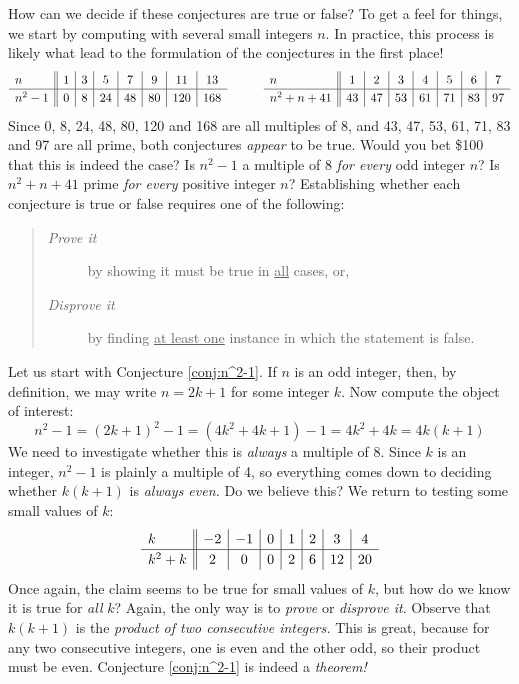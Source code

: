 How can we decide if these conjectures are true or false? To get a feel for things, we start by computing with several small integers $n$. In practice, this process is likely what lead to the formulation of the conjectures in the first place!
\[
	\def\arraystretch{1.2}
	\begin{array}{l||c|c|c|c|c|c|c}
		n & 1 & 3 & 5 & 7 & 9 & 11 & 13\\\hline
		n^2-1 & 0 & 8 & 24 & 48 & 80 & 120 & 168
	\end{array}
	\qquad\quad
	\begin{array}{l||c|c|c|c|c|c|c}
		n & 1 & 2 & 3 & 4 & 5 & 6 & 7\\\hline
		n^2+n+41 & 43 & 47 & 53 & 61 & 71 & 83 & 97
	\end{array}
\]
Since 0, 8, 24, 48, 80, 120 and 168 are all multiples of 8, and 43, 47, 53, 61, 71, 83 and 97 are all prime, both conjectures \emph{appear} to be true. Would you bet \$100 that this is indeed the case? Is $n^2-1$ a multiple of 8 \emph{for every} odd integer $n$? Is $n^2+n+41$ prime \emph{for every} positive integer $n$? Establishing whether each conjecture is true or false requires one of the following:

\begin{quote}
\begin{description}
  \item[\normalfont\emph{Prove it}] by showing it must be true in \underline{all} cases, or,
  \item[\normalfont\emph{Disprove it}] by finding \underline{at least one} instance in which the statement is false.
\end{description}
\end{quote}

Let us start with Conjecture \ref{conj:n^2-1}. If $n$ is an odd integer, then, by definition, we may write $n=2k+1$ for some integer $k$. Now compute the object of interest:
\[
	n^2-1 =(2k+1)^2-1 =(4k^2+4k+1)-1 =4k^2+4k =4k(k+1)
\]
We need to investigate whether this is \emph{always} a multiple of 8. Since $k$ is an integer, $n^2-1$ is plainly a multiple of 4, so everything comes down to deciding whether $k(k+1)$ is \emph{always even.} Do we believe this? We return to testing some small values of $k$:
\[
	\def\arraystretch{1.2}
	\begin{array}{l||c|c|c|c|c|c|c}
		k & -2 & -1 & 0 & 1 & 2 & 3 & 4\\\hline
		k^2+k & 2 & 0 & 0 & 2 & 6 & 12 & 20
	\end{array}
\]
Once again, the claim seems to be true for small values of $k$, but how do we know it is true for \emph{all} $k$? Again, the only way is to \emph{prove} or \emph{disprove it}. Observe that $k(k+1)$ is the \emph{product of two consecutive integers.} This is great, because for any two consecutive integers, one is even and the other odd, so their product must be even. Conjecture \ref{conj:n^2-1} is indeed a \emph{theorem!}\smallbreak

